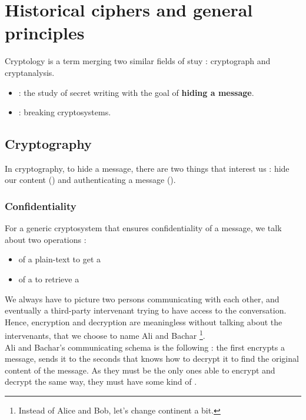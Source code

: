 \documentclass[../Cryptography.tex]{subfiles}
\begin{document}
\chapter{Historical ciphers and general principles}
Cryptology is a term merging two similar fields of stuy : cryptograph and cryptanalysis.
\begin{itemize}
    \item {} : the study of secret writing with the goal of \textbf{hiding a message}.
    \item {} : breaking cryptosystems. 
\end{itemize}
\section{Cryptography}
In cryptography, to hide a message, there are two things that interest us : hide our content () and authenticating a message ().

\subsection{Confidentiality}
For a generic cryptosystem that ensures confidentiality of a message, we talk about two operations : 
\begin{itemize}
    \item {} of a plain-text  to get a 
    \item {} of a  to retrieve a 
\end{itemize}

We always have to picture two persons communicating with each other, and eventually a third-party intervenant trying to have access to the conversation. Hence, encryption and decryption are meaningless without talking about the intervenants, that we choose to name Ali and Bachar \footnote{Instead of Alice and Bob, let's change continent a bit.}. \\

Ali and Bachar's communicating schema is the following : the first encrypts a message, sends it to the seconds that knows how to decrypt it to find the original content of the message. As they must be the only ones able to encrypt and decrypt the same way, they must have some kind of .\\
\end{document}
